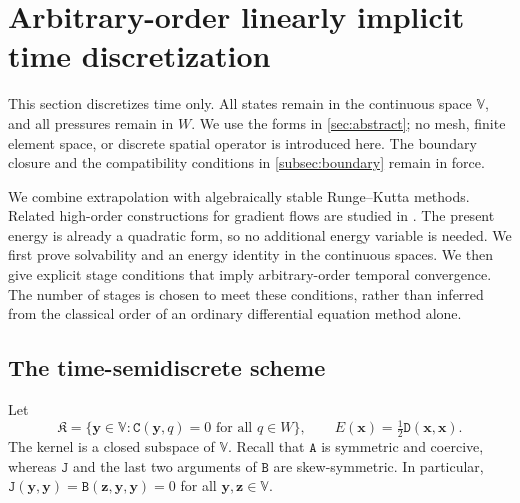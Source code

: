 \documentclass[11pt,a4paper]{article}
\newif\ifcurrentchanges
\newenvironment{currentchange}{\begingroup\ifcurrentchanges\color{red}\fi}{\endgroup}
\newcommand{\bs}{\boldsymbol}
\newcommand{\dt}{\Delta t}
\newcommand{\V}{\mathbb V}
\newcommand{\DD}{\mathtt D}
\newcommand{\Aform}{\mathtt A}
\newcommand{\JJ}{\mathtt J}
\newcommand{\BB}{\mathtt B}
\newcommand{\CC}{\mathtt C}
\theoremstyle{definition}
\numberwithin{equation}{section}
\begin{document}


\section{Arbitrary-order linearly implicit time discretization}
\label{sec:ho:arbitrary-order}

This section discretizes time only. All states remain in the continuous space
$\V$, and all pressures remain in $W$. We use the forms in
\cref{sec:abstract}; no mesh, finite element space, or discrete spatial operator
is introduced here. The boundary closure and the compatibility conditions in
\cref{subsec:boundary} remain in force.

We combine extrapolation with algebraically stable Runge--Kutta methods.
Related high-order constructions for gradient flows are studied in
\cite{HO_AkrivisLiLi2019,HO_GongZhaoWang2020}. The present energy is already a
quadratic form, so no additional energy variable is needed. We first prove
solvability and an energy identity in the continuous spaces. We then give
explicit stage conditions that imply arbitrary-order temporal convergence.
The number of stages is chosen to meet these conditions, rather than inferred
from the classical order of an ordinary differential equation method alone.

\subsection{The time-semidiscrete scheme}
Let
\begin{equation}\label{eq:ho:kernel}
 \mathfrak K=\{\bs y\in\V:\CC(\bs y,q)=0\text{ for all }q\in W\},
 \qquad E(\bs x)=\tfrac12\DD(\bs x,\bs x).
\end{equation}
The kernel is a closed subspace of $\V$. Recall that $\Aform$ is symmetric and
coercive, whereas $\JJ$ and the last two arguments of $\BB$ are skew-symmetric.
In particular, $\JJ(\bs y,\bs y)=\BB(\bs z,\bs y,\bs y)=0$ for all $\bs y,\bs z\in\V$.
\end{document}
